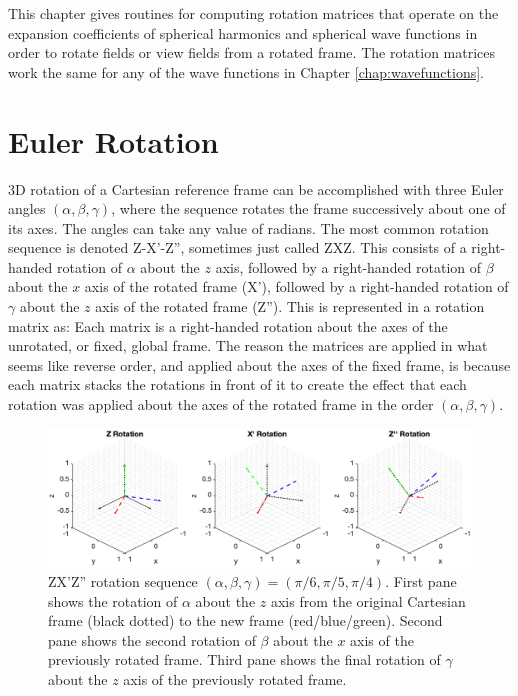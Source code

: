 

\vspace{-7mm}
This chapter gives routines for computing rotation matrices that operate on the expansion coefficients of spherical harmonics and spherical wave functions in order to rotate fields or view fields from a rotated frame.  The rotation matrices work the same for any of the wave functions in Chapter \ref{chap:wavefunctions}.

\section{Euler Rotation}
3D rotation of a Cartesian reference frame can be accomplished with three Euler angles $(\alpha,\beta,\gamma)$, where the sequence rotates the frame successively about one of its axes. The angles can take any value of radians. The most common rotation sequence is denoted Z-X'-Z'', sometimes just called ZXZ. This consists of a right-handed rotation of $\alpha$ about the $z$ axis, followed by a right-handed rotation of $\beta$ about the $x$ axis of the rotated frame (X'), followed by a right-handed rotation of $\gamma$ about the $z$ axis of the rotated frame (Z''). This is represented in a rotation matrix as:
Each matrix is a right-handed rotation about the axes of the unrotated, or fixed, global frame. The reason the matrices are applied in what seems like reverse order, and applied about the axes of the fixed frame, is because each matrix stacks the rotations in front of it to create the effect that each rotation was applied about the axes of the rotated frame in the order $(\alpha,\beta,\gamma)$.

\begin{figure}[H] 
   \centering
   \includegraphics[width=6.5in]{Rotation/Figures/ZXZ} 
   \caption{ZX'Z'' rotation sequence $(\alpha,\beta,\gamma) = (\pi/6, \pi/5, \pi/4)$.  First pane shows the rotation of $\alpha$ about the $z$ axis from the original Cartesian frame (black dotted) to the new frame (red/blue/green). Second pane shows the second rotation of $\beta$ about the $x$ axis of the previously rotated frame. Third pane shows the final rotation of $\gamma$ about the $z$ axis of the previously rotated frame.}
   \label{fig1}
\end{figure}


